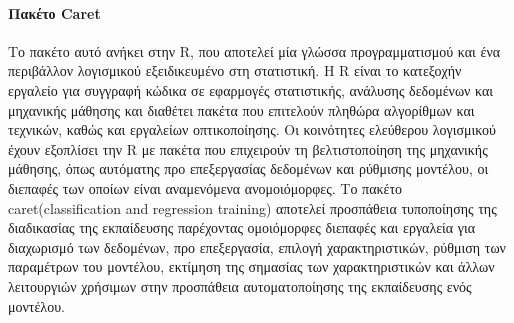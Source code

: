 \documentclass{article}
\begin{document}
\paragraph{Πακέτο Caret} Το πακέτο αυτό ανήκει στην R, που αποτελεί μία γλώσσα προγραμματισμού και ένα περιβάλλον λογισμικού εξειδικευμένο στη στατιστική. Η R είναι το κατεξοχήν εργαλείο για συγγραφή κώδικα σε εφαρμογές στατιστικής, ανάλυσης δεδομένων και μηχανικής μάθησης και  διαθέτει πακέτα που επιτελούν πληθώρα αλγορίθμων και τεχνικών, καθώς και εργαλείων οπτικοποίησης. Οι κοινότητες ελεύθερου λογισμικού έχουν εξοπλίσει την R με πακέτα που επιχειρούν τη βελτιστοποίηση της μηχανικής μάθησης, όπως αυτόματης προ επεξεργασίας δεδομένων και  ρύθμισης μοντέλου, οι διεπαφές των οποίων είναι αναμενόμενα ανομοιόμορφες.  Το πακέτο caret(classification and regression training) αποτελεί προσπάθεια τυποποίησης της διαδικασίας της εκπαίδευσης παρέχοντας ομοιόμορφες διεπαφές και  εργαλεία για διαχωρισμό των δεδομένων, προ επεξεργασία, επιλογή χαρακτηριστικών, ρύθμιση των παραμέτρων του μοντέλου, εκτίμηση της σημασίας των χαρακτηριστικών και άλλων λειτουργιών χρήσιμων στην προσπάθεια αυτοματοποίησης της εκπαίδευσης ενός μοντέλου.
\end{document}
